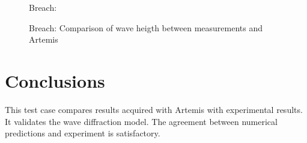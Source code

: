 \begin{figure}[h]
\begin{center}
\end{center}
\caption{Breach: }
\label{fig:breach_CERCResult}
\end{figure}

\begin{figure}[h]
\begin{center}
\end{center}
\caption{Breach: Comparison of wave heigth between measurements and Artemis }
\label{fig:breach_section}
\end{figure}

\section{Conclusions}
This test case compares results acquired with Artemis with experimental results.
It validates the wave diffraction model. The agreement between
numerical predictions and experiment is satisfactory.
